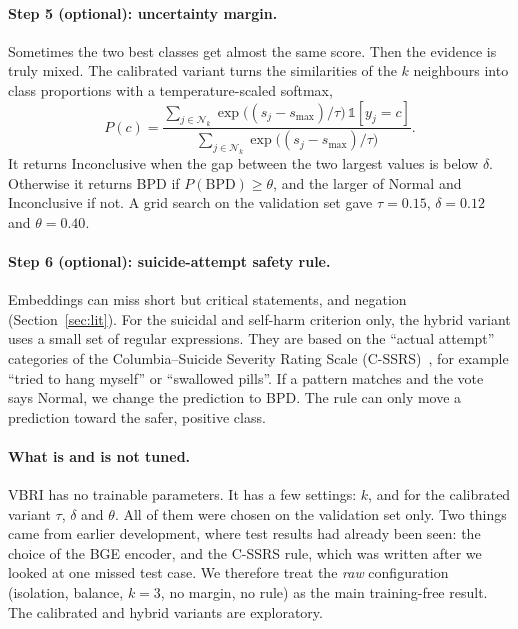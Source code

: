 \documentclass[11pt]{article}
\newcommand{\vbri}{VBRI}
\begin{document}
\paragraph{Step 5 (optional): uncertainty margin.}
Sometimes the two best classes get almost the same score. Then the evidence is truly mixed. The
calibrated variant turns the similarities of the $k$ neighbours into class proportions with a
temperature-scaled softmax,
\begin{equation}
P(c) = \frac{\sum_{j \in \mathcal{N}_k} \exp\big((s_j - s_{\max})/\tau\big)\,\mathbb{1}[y_j=c]}
            {\sum_{j \in \mathcal{N}_k} \exp\big((s_j - s_{\max})/\tau\big)}.
\end{equation}
It returns Inconclusive when the gap between the two largest values is below $\delta$. Otherwise it
returns BPD if $P(\text{BPD})\ge\theta$, and the larger of Normal and Inconclusive if not. A grid
search on the validation set gave $\tau=0.15$, $\delta=0.12$ and $\theta=0.40$.

\paragraph{Step 6 (optional): suicide-attempt safety rule.}
Embeddings can miss short but critical statements, and negation (Section~\ref{sec:lit}). For the
suicidal and self-harm criterion only, the hybrid variant uses a small set of regular expressions.
They are based on the ``actual attempt'' categories of the Columbia--Suicide Severity Rating Scale
(C-SSRS)~\cite{posner2011cssrs}, for example ``tried to hang myself'' or ``swallowed pills''. If a
pattern matches and the vote says Normal, we change the prediction to BPD. The rule can only move a
prediction toward the safer, positive class.

\paragraph{What is and is not tuned.}
\vbri{} has no trainable parameters. It has a few settings: $k$, and for the calibrated variant
$\tau$, $\delta$ and $\theta$. All of them were chosen on the validation set only. Two things came
from earlier development, where test results had already been seen: the choice of the BGE encoder,
and the C-SSRS rule, which was written after we looked at one missed test case. We therefore treat
the \emph{raw} configuration (isolation, balance, $k=3$, no margin, no rule) as the main
training-free result. The calibrated and hybrid variants are exploratory.
\end{document}
